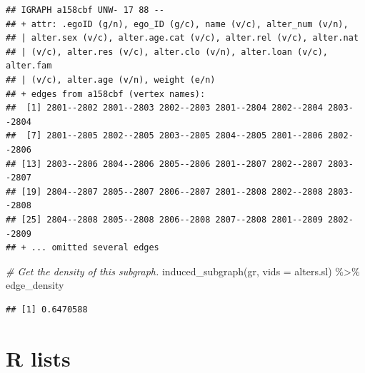 \documentclass[
]{book}
\newenvironment{Shaded}{\begin{snugshade}}{\end{snugshade}}
\newcommand{\AttributeTok}[1]{\textcolor[rgb]{0.77,0.63,0.00}{#1}}
\newcommand{\CommentTok}[1]{\textcolor[rgb]{0.56,0.35,0.01}{\textit{#1}}}
\newcommand{\FunctionTok}[1]{\textcolor[rgb]{0.00,0.00,0.00}{#1}}
\newcommand{\NormalTok}[1]{#1}
\newcommand{\SpecialCharTok}[1]{\textcolor[rgb]{0.00,0.00,0.00}{#1}}
\begin{document}
\begin{verbatim}
## IGRAPH a158cbf UNW- 17 88 -- 
## + attr: .egoID (g/n), ego_ID (g/c), name (v/c), alter_num (v/n),
## | alter.sex (v/c), alter.age.cat (v/c), alter.rel (v/c), alter.nat
## | (v/c), alter.res (v/c), alter.clo (v/n), alter.loan (v/c), alter.fam
## | (v/c), alter.age (v/n), weight (e/n)
## + edges from a158cbf (vertex names):
##  [1] 2801--2802 2801--2803 2802--2803 2801--2804 2802--2804 2803--2804
##  [7] 2801--2805 2802--2805 2803--2805 2804--2805 2801--2806 2802--2806
## [13] 2803--2806 2804--2806 2805--2806 2801--2807 2802--2807 2803--2807
## [19] 2804--2807 2805--2807 2806--2807 2801--2808 2802--2808 2803--2808
## [25] 2804--2808 2805--2808 2806--2808 2807--2808 2801--2809 2802--2809
## + ... omitted several edges
\end{verbatim}

\begin{Shaded}
\begin{Highlighting}[]
\CommentTok{\# Get the density of this subgraph.}
\FunctionTok{induced\_subgraph}\NormalTok{(gr, }\AttributeTok{vids =}\NormalTok{ alters.sl) }\SpecialCharTok{\%\textgreater{}\%} 
\NormalTok{  edge\_density}
\end{Highlighting}
\end{Shaded}

\begin{verbatim}
## [1] 0.6470588
\end{verbatim}

\hypertarget{lists}{%
\section{R lists}\label{lists}}
\end{document}
